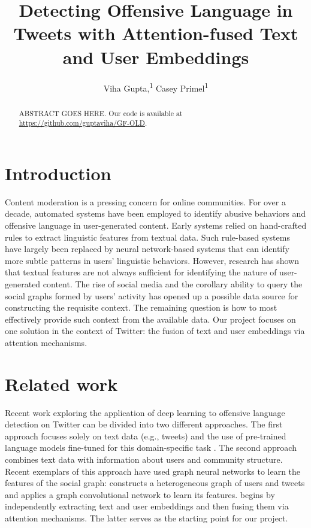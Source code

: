 \documentclass[letterpaper]{article} %
\title{Detecting Offensive Language in Tweets with Attention-fused Text and User Embeddings}
\author {
    Viha Gupta,\textsuperscript{\rm 1}
    Casey Primel\textsuperscript{\rm 1}
}
\begin{document}
\maketitle

\begin{abstract}
    ABSTRACT GOES HERE. Our code is available at \url{https://github.com/guptaviha/GF-OLD}.
\end{abstract}

\section{Introduction}

Content moderation is a pressing concern for online communities. For over a decade, automated systems have been employed to identify abusive behaviors and offensive language in user-generated content. Early systems relied on hand-crafted rules to extract linguistic features from textual data. Such rule-based systems have largely been replaced by neural network-based systems that can identify more subtle patterns in users' linguistic behaviors. However, research has shown that textual features are not always sufficient for identifying the nature of user-generated content. The rise of social media and the corollary ability to query the social graphs formed by users' activity has opened up a possible data source for constructing the requisite context. The remaining question is how to most effectively provide such context from the available data. Our project focuses on one solution in the context of Twitter: the fusion of text and user embeddings via attention mechanisms.

\section{Related work}

Recent work exploring the application of deep learning to offensive language detection on Twitter can be divided into two different approaches. The first approach focuses solely on text data (e.g., tweets) and the use of pre-trained language models fine-tuned for this domain-specific task \citep{liu2019-nuli}. The second approach combines text data with information about users and community structure. Recent exemplars of this approach have used graph neural networks to learn the features of the social graph: \citet{Mishra2019} constructs a heterogeneous graph of users and tweets and applies a graph convolutional network to learn its features. \citet{Miao2022} begins by independently extracting text and user embeddings and then fusing them via attention mechanisms. The latter serves as the starting point for our project.
\end{document}

